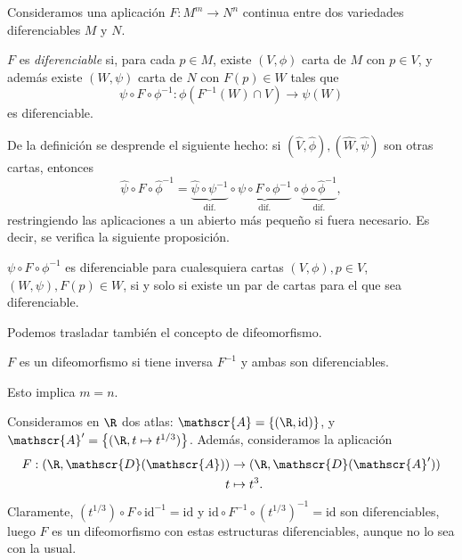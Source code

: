 Consideramos una aplicación $F: M^{m}\to N^{n}$ continua entre dos variedades
diferenciables $M$ y $N$.
\begin{ndef}
  $F$ es \emph{diferenciable} si, para cada $p\in M$, existe $(V,\phi)$ carta de
  $M$ con $p\in V$, y además existe $(W,\psi)$ carta de $N$ con $F(p)\in W$
  tales que
  \[
    \psi\circ F\circ \phi^{-1}: \phi(F^{-1}(W)\cap V)\to \psi(W)
  \]
  es diferenciable.
\end{ndef}
De la definición se desprende el siguiente hecho: si $(\hat{V},\hat{\phi}),
(\hat{W},\hat{\psi})$ son otras cartas, entonces
\[
  \hat{\psi}\circ F\circ\hat{\phi}^{-1} = \underbrace{\hat{\psi}\circ\psi^{-1}}_{\text{dif.}}\circ\underbrace{\psi\circ
  F \circ \phi^{-1}}_{\text{dif.}}\circ \underbrace{\phi \circ \hat{\phi}^{-1}}_{\text{dif.}}
,\]
restringiendo las aplicaciones a un abierto más pequeño si fuera necesario. Es
decir, se verifica la siguiente proposición.
\begin{nprop}
  $\psi\circ F\circ \phi^{-1}$ es diferenciable para cualesquiera cartas
  $(V,\phi), p\in V$, $(W,\psi), F(p)\in W$, si y solo si existe un par de
  cartas para el que sea diferenciable.
\end{nprop}

Podemos trasladar también el concepto de difeomorfismo.
\begin{ndef}[Difeomorfismo]
  $F$ es un difeomorfismo si tiene inversa $F^{-1}$ y ambas son diferenciables.
\end{ndef}
\begin{nota}
  Esto implica $m=n$.
\end{nota}

\begin{ejemplo}
  Consideramos en $\R$ dos atlas: $\mathscr{A} = \left\{ (\R,\mathrm{id})
  \right\}$, y $\mathscr{A}' = \left\{ (\R,t\mapsto t^{1/3}) \right\}$. Además,
  consideramos la aplicación
\begin{alignat*}{2}
    F: (\R,\mathscr{D}(\mathscr{A})) & \to (\R, \mathscr{D}(\mathscr{A}')) \\
    t & \mapsto t^{3}.
\end{alignat*}
  Claramente, $(t^{1/3})\circ F\circ \mathrm{id}^{-1} = \mathrm{id}$ y
  $\mathrm{id}\circ F^{-1}\circ (t^{1/3})^{-1} = \mathrm{id}$ son
  diferenciables, luego $F$ es un difeomorfismo con estas estructuras
  diferenciables, aunque no lo sea con la usual.
\end{ejemplo}

